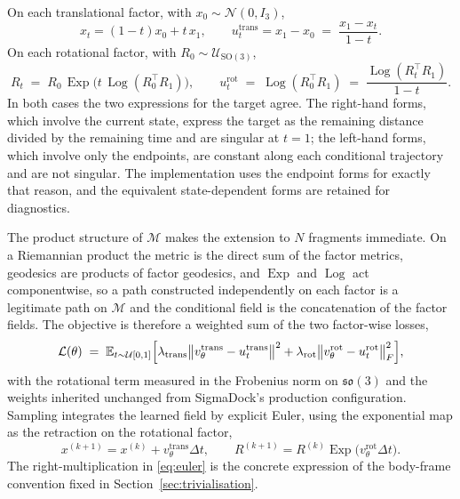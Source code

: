 \documentclass[11pt,a4paper]{report}
\theoremstyle{plain}
\theoremstyle{definition}
\theoremstyle{remark}
\newcommand{\SOthree}{\mathrm{SO}(3)}
\newcommand{\sothree}{\mathfrak{so}(3)}
\newcommand{\Mfd}{\mathcal{M}}
\newcommand{\Exp}{\operatorname{Exp}}
\newcommand{\Log}{\operatorname{Log}}
\newcommand{\E}{\mathbb{E}}
\newcommand{\Loss}{\mathcal{L}}
\newcommand{\vfield}{u}
\newcommand{\pred}{v_\theta}
\newcommand{\Haar}{\mathcal{U}_{\SOthree}}
\newcommand{\Rot}{R}
\begin{document}
On each translational factor, with $x_0 \sim \mathcal{N}(0,I_3)$,
\begin{equation}
  x_t = (1-t)x_0 + t\,x_1,
  \qquad
  \vfield_t^{\mathrm{trans}} = x_1 - x_0 \;=\; \frac{x_1 - x_t}{1-t}.
  \label{eq:sf-trans}
\end{equation}
On each rotational factor, with $\Rot_0 \sim \Haar$,
\begin{equation}
  \Rot_t \;=\; \Rot_0\, \Exp\!\bigl(t\, \Log(\Rot_0^\top \Rot_1)\bigr),
  \qquad
  \vfield_t^{\mathrm{rot}} \;=\; \Log(\Rot_0^\top\Rot_1)
  \;=\; \frac{\Log(\Rot_t^\top \Rot_1)}{1-t}.
  \label{eq:sf-rot}
\end{equation}
In both cases the two expressions for the target agree. The right-hand forms,
which involve the current state, express the target as the remaining distance
divided by the remaining time and are singular at $t=1$; the left-hand forms,
which involve only the endpoints, are constant along each conditional
trajectory and are not singular. The implementation uses the endpoint forms
for exactly that reason, and the equivalent state-dependent forms are retained
for diagnostics.

The product structure of $\Mfd$ makes the extension to $N$ fragments
immediate. On a Riemannian product the metric is the direct sum of the factor
metrics, geodesics are products of factor geodesics, and $\Exp$ and $\Log$ act
componentwise, so a path constructed independently on each factor is a
legitimate path on $\Mfd$ and the conditional field is the concatenation of the
factor fields. The objective is therefore a weighted sum of the two factor-wise
losses,
\begin{equation}
  \Loss(\theta) \;=\;
  \E_{t\sim\mathcal{U}[0,1]}\Bigl[
    \lambda_{\mathrm{trans}}\bigl\|\pred^{\mathrm{trans}}
      - \vfield_t^{\mathrm{trans}}\bigr\|^{2}
    + \lambda_{\mathrm{rot}}\bigl\|\pred^{\mathrm{rot}}
      - \vfield_t^{\mathrm{rot}}\bigr\|_F^{2}\Bigr],
  \label{eq:sf-objective}
\end{equation}
with the rotational term measured in the Frobenius norm on $\sothree$ and the
weights inherited unchanged from SigmaDock's production configuration.
Sampling integrates the learned field by explicit Euler, using the exponential
map as the retraction on the rotational factor,
\begin{equation}
  x^{(k+1)} = x^{(k)} + \pred^{\mathrm{trans}}\Delta t,
  \qquad
  \Rot^{(k+1)} = \Rot^{(k)}\Exp\!\bigl(\pred^{\mathrm{rot}}\Delta t\bigr).
  \label{eq:euler}
\end{equation}
The right-multiplication in \eqref{eq:euler} is the concrete expression of the
body-frame convention fixed in Section~\ref{sec:trivialisation}.
\end{document}
